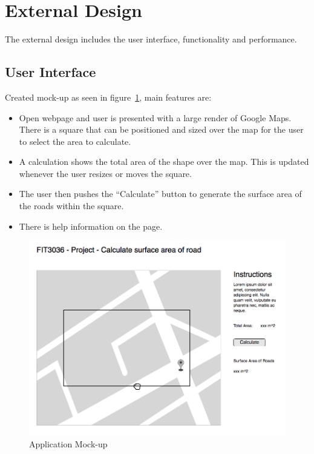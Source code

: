 \documentclass[a4paper,11pt]{article}
\begin{document}
\section{External Design}

The external design includes the user interface, functionality and performance.

\subsection{User Interface}

Created mock-up as seen in figure~\ref{fig:mockup}, main features are:

\begin{itemize}
  \item Open webpage and user is presented with a large render of Google Maps.
    There is a square that can be positioned and sized over the map for the user
    to select the area to calculate.
  \item A calculation shows the total area of the shape over the map. This is
    updated whenever the user resizes or moves the square.
  \item The user then pushes the ``Calculate'' button to generate the surface
    area of the roads within the square.
  \item There is help information on the page.
\end{itemize}

\begin{figure}[H]
  \includegraphics[width=\textwidth]{UI-mockup}
  \caption{Application Mock-up}\label{fig:mockup}
\end{figure}
\end{document}

